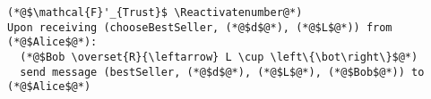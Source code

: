 \Suppressnumber
\begin{lstlisting}[label=badtrustfunc, style=numbers]
(*@$\mathcal{F}'_{Trust}$ \Reactivatenumber@*)
Upon receiving (chooseBestSeller, (*@$d$@*), (*@$L$@*)) from (*@$Alice$@*):
  (*@$Bob \overset{R}{\leftarrow} L \cup \left\{\bot\right\}$@*) 
  send message (bestSeller, (*@$d$@*), (*@$L$@*), (*@$Bob$@*)) to (*@$Alice$@*)
\end{lstlisting}
